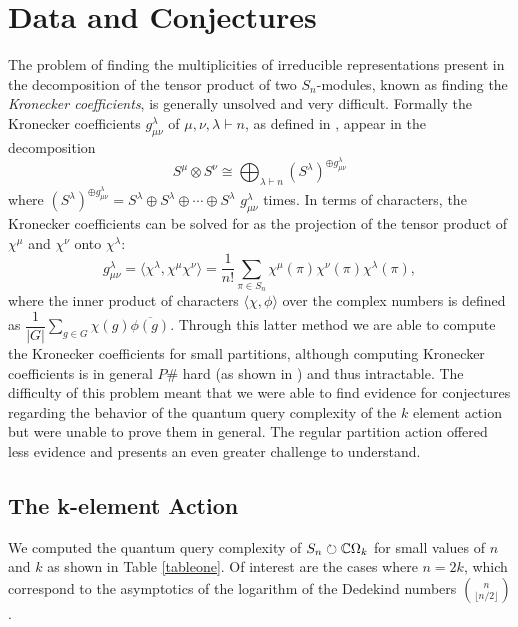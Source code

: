 \documentclass[12pt,twoside]{reedthesis}
\theoremstyle{plain}   %
\theoremstyle{definition}
\theoremstyle{remark}
\numberwithin{equation}{section}
\def\acts{\circlearrowright} %
\begin{document}
  \section{Data and Conjectures}
  The problem of finding the multiplicities of irreducible representations present in the decomposition of the tensor product of two $S_n$-modules, known as finding the \emph{Kronecker coefficients},
  is generally unsolved and very difficult. Formally the Kronecker coefficients $g^\lambda_{\mu \nu}$ of $\mu, \nu, \lambda \vdash n$, as defined in \cite[Definition 2.4.1]{wang2021}, appear in the decomposition
  \[ S^\mu \otimes S^\nu \cong \bigoplus_{\lambda \vdash n}  (S^\lambda)^{\oplus g^\lambda_{\mu \nu}}\]
  where $(S^\lambda)^{\oplus g^\lambda_{\mu \nu}} = S^\lambda \oplus S^\lambda \oplus \cdots \oplus S^\lambda $ $g^\lambda_{\mu \nu}$ times.
  In terms of characters, the Kronecker coefficients can be solved for as the projection of the tensor product of $\chi^\mu$ and $\chi^\nu$ onto $\chi^\lambda$:
  \[ g^\lambda_{\mu \nu} = \langle \chi^{\lambda} , \chi^\mu \chi^{\nu} \rangle = \dfrac{1}{n!} \sum_{\pi \in S_n} \chi^\mu(\pi) \chi^\nu(\pi) \chi^\lambda (\pi),\]
  where the inner product of characters $\langle \chi, \phi \rangle$ over the complex numbers is defined as $\dfrac{1}{|G|} \sum_{g \in G} \chi(g) \overline{\phi(g)}$.
  Through this latter method we are able to compute the Kronecker coefficients for small partitions, although computing Kronecker coefficients is in general $P\#$ hard (as shown in \cite[Theorem 1]{burgisser2008}) and thus intractable.
  The difficulty of this problem meant that we were able to find evidence for conjectures regarding the behavior of the quantum query complexity of the $k$ element action but were unable to prove them in general.
  The regular partition action offered less evidence and presents an even greater challenge to understand.
  \subsection{The k-element Action}
  We computed the quantum query complexity of $S_n \acts \CC \Omega_k$ for small values of $n$ and $k$ as shown in Table \ref{tableone}. Of interest are the cases where $n = 2k$, which correspond to the
  asymptotics of the logarithm of the Dedekind numbers $\binom{n}{\lfloor{n/2} \rfloor}$.
\end{document}
